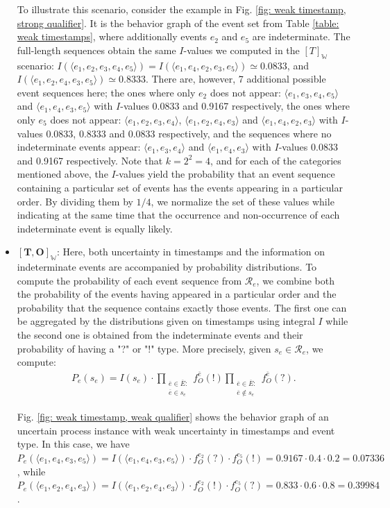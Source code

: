 \begin{itemize}
To illustrate this scenario, consider the example in Fig. \ref{fig: weak timestamp, strong qualifier}.
It is the behavior graph of the event set from Table \ref{table: weak timestamps}, where additionally events $e_2$ and $e_5$ are indeterminate.
The full-length sequences obtain the same $I$-values we computed in the $[T]_{\mathbb{W}}$ scenario:
$I(\langle e_1,e_2,e_3,e_4,e_5\rangle) = I(\langle e_1,e_4,e_2,e_3,e_5 \rangle) \simeq 0.0833$, and $I(\langle e_1,e_2,e_4,e_3,e_5 \rangle) \simeq 0.8333$.
There are, however, 7 additional possible event sequences here;
the ones where only $e_2$ does not appear: 
$\langle e_1,e_3,e_4,e_5 \rangle$ and $\langle e_1,e_4,e_3,e_5 \rangle$ with $I$-values 0.0833 and 0.9167 respectively, the ones where only $e_5$ does not appear:
$\langle e_1,e_2,e_3,e_4 \rangle$, $\langle e_1,e_2,e_4,e_3 \rangle$ and $\langle e_1,e_4,e_2,e_3 \rangle$ with $I$-values 0.0833, 0.8333 and 0.0833 respectively, and the sequences where no indeterminate events appear: $\langle e_1,e_3,e_4 \rangle$ and $\langle e_1,e_4,e_3 \rangle$ with $I$-values 0.0833 and 0.9167 respectively.
Note that $k=2^2=4$, and for each of the categories mentioned above, the $I$-values yield the probability that an event sequence containing a particular set of events has the events appearing in a particular order.
By dividing them by $1/4$, we normalize the set of these values while indicating at the same time that the occurrence and non-occurrence of each indeterminate event is equally likely.

\item
$\boldsymbol{[T,O]_{\mathbb{W}}}$:
Here, both uncertainty in timestamps and the information on indeterminate events are accompanied by probability distributions.
To compute the probability of each event sequence from $\mathcal{R}_e$, we combine both the probability of the events having appeared in a particular order and the probability that the sequence contains exactly those events.
The first one can be aggregated by the distributions given on timestamps using integral $I$ while the second one is obtained from the indeterminate events and their probability of having a "?" or "!" type.
More precisely, given $s_e \in \mathcal{R}_e$, we compute:
\begin{align*}
P_e(s_e)= I(s_e) \cdot \prod_{\substack{\overline{e} \in \overline{E}: \\ \overline{e} \in s_e}} f_O^{\overline{e}}(!)
\prod_{\substack{\overline{e} \in \overline{E}: \\ \overline{e} \not \in s_e}} f_O^{\overline{e}}(?).
\end{align*}

Fig. \ref{fig: weak timestamp, weak qualifier} shows the behavior graph of an uncertain process instance with weak uncertainty in timestamps and event type. 
In this case, we have 
$P_e(\langle e_1, e_4, e_3, e_5\rangle) =  
I(\langle e_1, e_4, e_3, e_5\rangle) \cdot f_O^{e_2}(?) \cdot f_O^{e_5}(!)= 0.9167 \cdot 0.4 \cdot 0.2 = 0.07336$, while 
$P_e(\langle e_1, e_2, e_4, e_3\rangle) =  
I(\langle e_1, e_2, e_4, e_3\rangle) \cdot f_O^{e_2}(!) \cdot f_O^{e_5}(?)= 0.833 \cdot 0.6 \cdot 0.8 = 0.39984$.
%
\end{itemize}
